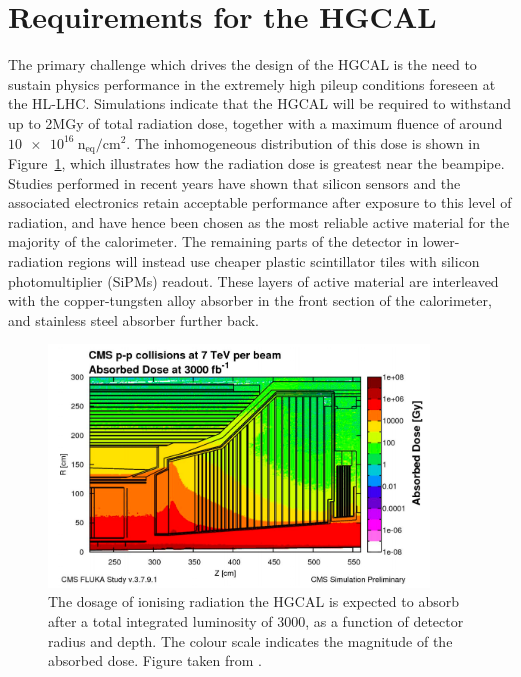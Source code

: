 \section{Requirements for the HGCAL}

The primary challenge which drives the design of the HGCAL is the need to 
sustain physics performance in the extremely high pileup conditions foreseen at the HL-LHC.
Simulations indicate that the HGCAL will be required to withstand up to 2MGy of total radiation dose, 
together with a maximum fluence of around $\SI{10e16}{\textrm{n}_{\textrm{eq}}/\textrm{cm}^2}.$
The inhomogeneous distribution of this dose is shown in Figure~\ref{fig:hgcal_Dose}, 
which illustrates how the radiation dose is greatest near the beampipe.
Studies performed in recent years have shown that silicon sensors and the associated electronics 
retain acceptable performance after exposure to this level of radiation, 
and have hence been chosen as the most reliable active material for the majority of the calorimeter.
The remaining parts of the detector in lower-radiation regions will instead use 
cheaper plastic scintillator tiles with silicon photomultiplier (SiPMs) readout.
These layers of active material are interleaved with the copper-tungsten alloy absorber 
in the front section of the calorimeter, and stainless steel absorber further back.

\begin{figure}[h!]
  \centering
  \includegraphics[width=0.9\textwidth]{Figures/HGCAL/Dose.png}
  \caption[Expected radiation dose for the HGCAL.]
  {
    The dosage of ionising radiation the HGCAL is expected to absorb 
    after a total integrated luminosity of \SI{3000}{\fbinv}, 
    as a function of detector radius and depth.
    The colour scale indicates the magnitude of the absorbed dose.
    Figure taken from \cite{HGCAL}.
  }
  \label{fig:hgcal_Dose}
\end{figure}


